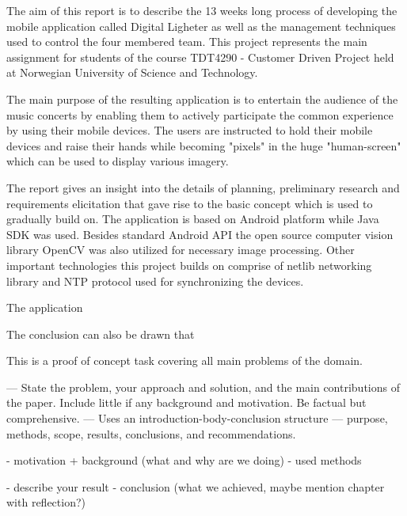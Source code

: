 The aim of this report is to describe the 13 weeks long process of developing the mobile application called Digital Ligheter as well as the management techniques used to control the four membered team. This project represents the main assignment for students of the course TDT4290 - Customer Driven Project held at Norwegian University of Science and Technology. 

The main purpose of the resulting application is to entertain the audience of the music concerts by enabling them to actively participate the common experience by using their mobile devices. The users are instructed to hold their mobile devices and raise their hands while becoming "pixels" in the huge "human-screen" which can be used to display various imagery.

The report gives an insight into the details of planning, preliminary research and requirements elicitation that gave rise to the basic concept which is used to gradually build on. The application is based on Android platform while Java SDK was used. Besides standard Android API the open source computer vision library OpenCV was also utilized for necessary image processing. Other important technologies this project builds on comprise of netlib networking library and NTP protocol used for synchronizing the devices.

The application 

The conclusion can also be drawn that


This is a proof of concept task covering all main problems of the domain.



--- State the problem, your approach and solution, and the main contributions of the paper. Include little if any background and motivation. Be factual but comprehensive. 
--- Uses an introduction-body-conclusion structure
--- purpose, methods, scope, results, conclusions, and recommendations.


- motivation + background (what and why are we doing)
- used methods

- describe your result
- conclusion (what we achieved, maybe mention chapter with reflection?)